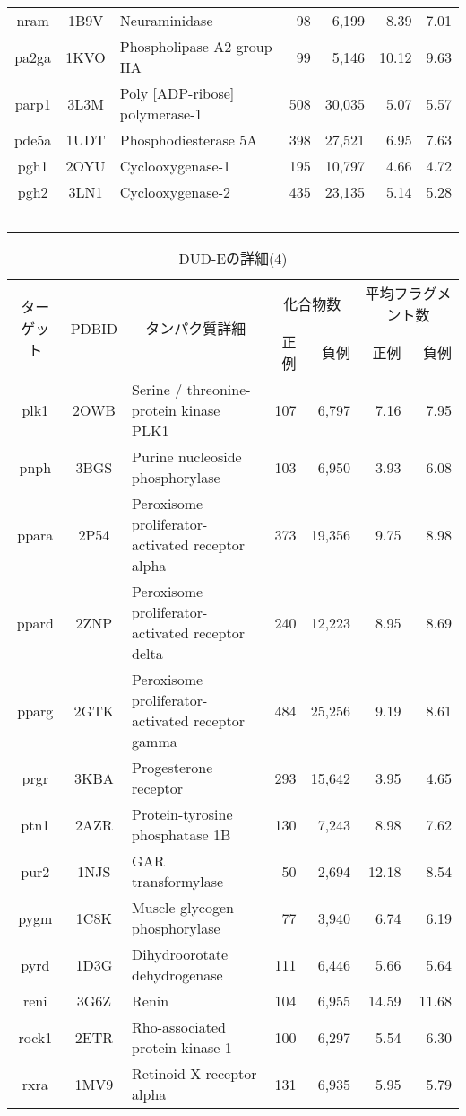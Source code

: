 \begin{table}[t]
\begin{tabular}{c|c|p{6cm}|rr|rr}
nram&1B9V&Neuraminidase&98&6,199&8.39&7.01 \\
pa2ga&1KVO&Phospholipase A2 group IIA&99&5,146&10.12&9.63 \\
parp1&3L3M&Poly [ADP-ribose] polymerase-1&508&30,035&5.07&5.57 \\
pde5a&1UDT&Phosphodiesterase 5A&398&27,521&6.95&7.63 \\
pgh1&2OYU&Cyclooxygenase-1&195&10,797&4.66&4.72 \\
pgh2&3LN1&Cyclooxygenase-2&435&23,135&5.14&5.28 \\
\hline
\multicolumn{7}{c}{\ } \\
	\end{tabular}
\end{table}
\begin{table}[t] \centering
	\caption{DUD-Eの詳細(4)}
	\label{tb:dude_description:4}
	\begin{tabular}{c|c|p{6cm}|rr|rr}
	\hline
	\multirow{2}{*}{ターゲット}	&\multirow{2}{*}{PDBID}	&\multicolumn{1}{c|}{\multirow{2}{*}{タンパク質詳細}}	&\multicolumn{2}{c|}{化合物数}	&\multicolumn{2}{c}{平均フラグメント数}		\\
							&					&											&正例	&負例				&正例	&負例						\\ \hline
plk1&2OWB&Serine / threonine-protein kinase PLK1&107&6,797&7.16&7.95 \\
pnph&3BGS&Purine nucleoside phosphorylase&103&6,950&3.93&6.08 \\
ppara&2P54&Peroxisome proliferator-activated receptor alpha&373&19,356&9.75&8.98 \\
ppard&2ZNP&Peroxisome proliferator-activated receptor delta&240&12,223&8.95&8.69 \\
pparg&2GTK&Peroxisome proliferator-activated receptor gamma&484&25,256&9.19&8.61 \\
prgr&3KBA&Progesterone receptor&293&15,642&3.95&4.65 \\
ptn1&2AZR&Protein-tyrosine phosphatase 1B&130&7,243&8.98&7.62 \\
pur2&1NJS&GAR transformylase&50&2,694&12.18&8.54 \\
pygm&1C8K&Muscle glycogen phosphorylase&77&3,940&6.74&6.19 \\
pyrd&1D3G&Dihydroorotate dehydrogenase&111&6,446&5.66&5.64 \\
reni&3G6Z&Renin&104&6,955&14.59&11.68 \\
rock1&2ETR&Rho-associated protein kinase 1&100&6,297&5.54&6.30 \\
rxra&1MV9&Retinoid X receptor alpha&131&6,935&5.95&5.79 \\

\end{tabular}
\end{table}
